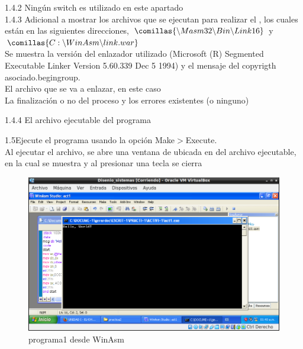 \large{1.4.2} Ningún switch es utilizado en este apartado\\


\large{1.4.3} Adicional a mostrar los archivos que se ejecutan para realizar el , los cuales están en las
siguientes direcciones,
$\comillas{\backslash Masm32\backslash Bin\backslash Link16}$ y $\comillas{C:\backslash WinAsm\backslash link.war} $\\
Se muestra la versión del enlazador utilizado (Microsoft (R) Segmented Executable Linker Version 5.60.339 Dec 5 1994) y el mensaje del copyrigth asociado.begingroup.\\ 
El archivo  que se va a enlazar, en este caso \\
La finalización o no del proceso y los errores existentes (o ninguno)

\large{1.4.4} El archivo ejecutable del programa 


\large{1.5}Ejecute el programa usando la opción Make$>$Execute.\\ 

Al ejecutar el archivo, se abre una ventana de  ubicada en  del archivo ejecutable, en la cual se muestra  y al presionar una tecla se cierra



\begin{figure}[H]
  \includegraphics[width=\linewidth]{practica2/imagenes/ej1/ej1.png}
  \caption{programa1 desde WinAsm}
\end{figure}

